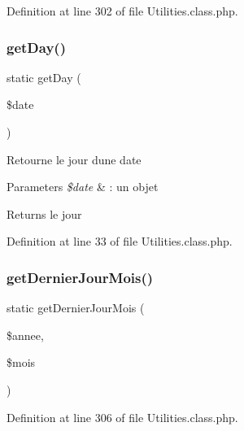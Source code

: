 Definition at line 302 of file Utilities.\+class.\+php.

\mbox{\label{class_utilities_a932a96b8eac601a1842e040c703657a5}} 
\subsubsection{\texorpdfstring{get\+Day()}{getDay()}}
{\footnotesize\ttfamily static get\+Day (\begin{DoxyParamCaption}\item[{}]{\$date }\end{DoxyParamCaption})\hspace{0.3cm}{\ttfamily [static]}}

Retourne le jour d\textquotesingle{}une date 
\begin{DoxyParams}{Parameters}
{\em \$date} & \+: un objet  \\
\hline
\end{DoxyParams}
\begin{DoxyReturn}{Returns}
le jour 
\end{DoxyReturn}


Definition at line 33 of file Utilities.\+class.\+php.

\mbox{\label{class_utilities_a9c7006be389743193fe09b92b5d57e3f}} 
\subsubsection{\texorpdfstring{get\+Dernier\+Jour\+Mois()}{getDernierJourMois()}}
{\footnotesize\ttfamily static get\+Dernier\+Jour\+Mois (\begin{DoxyParamCaption}\item[{}]{\$annee,  }\item[{}]{\$mois }\end{DoxyParamCaption})\hspace{0.3cm}{\ttfamily [static]}}



Definition at line 306 of file Utilities.\+class.\+php.

\mbox{\label{class_utilities_a47fb2f7c80a9da546689e7ff188aa58b}} 
